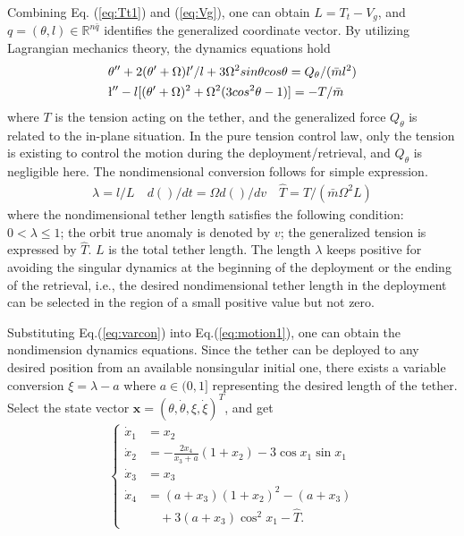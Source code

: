 \documentclass[conference]{IEEEtran}
\theoremstyle{plain}
\begin{document}
Combining Eq. (\ref{eq:Tt1}) and (\ref{eq:Vg}), one can obtain $L =T_t-V_g$, and  ${q}=(\theta,l)\in \mathbb{R}^{n\bar{q}}$ identifies the generalized coordinate vector. By utilizing Lagrangian mechanics theory, the dynamics equations hold~\cite{Williams2009745}
\begin{align}
\begin{split}
&\theta''+2(\theta'+\Omega)l'/l+3\Omega^2sin{\theta} cos{\theta}=Q_\theta/(\bar{m}l^2)\\
&\l''-l[(\theta'+\Omega)^2+\Omega^2(3cos{^2\theta}-1)]= -T/\bar{m}\label{eq:motion1}
\end{split}
\end{align}
where $T$ is the tension acting on the tether, and the generalized force $Q_\theta$ is related to the in-plane situation. In the pure tension control law, only the tension is existing to control the motion during the deployment/retrieval, and $Q_\theta$ is negligible here. The nondimensional conversion follows for simple expression.
\begin{align}
\lambda=l/L\quad
d()/dt=\Omega d()/dv\quad
\hat{T}=T/(\bar{m}\Omega^2L)\label{eq:varcon}
\end{align}
where the nondimensional tether length satisfies the following condition: $0<\lambda \le 1$; the orbit true anomaly is denoted by $v$; the generalized tension is expressed by $\hat{T}$. $L$ is the total tether length. The length $\lambda$ keeps positive for avoiding the singular dynamics at the beginning of the deployment or the ending of the retrieval, i.e., the desired nondimensional tether length in the deployment can be selected in the region of a small positive value but not zero.\par
Substituting Eq.(\ref{eq:varcon}) into Eq.(\ref{eq:motion1}), one can obtain the nondimension dynamics equations. Since the tether can be deployed to any desired position from an available nonsingular initial one, there exists a variable conversion $\xi =\lambda - a$ where $a\in(0,1]$ representing the desired length of the tether. Select the state vector $\bm{x} = (\theta,\dot\theta,\xi,\dot\xi)^T$, and get
\begin{align}
\begin{cases}
\dot x_1 &= x_2\\
\dot x_2 &= -\frac{2x_4}{x_3+a}(1+x_2)-3\cos{x_1}\sin{x_1}\\
\dot x_3 &= x_3\\
\dot x_4 &= (a+x_3)(1+x_2)^2-(a+x_3)\\&\quad+3(a+x_3)\cos^2{x_1}-\hat{T}.\label{eq:initial system}
\end{cases}
\end{align}
\end{document}
